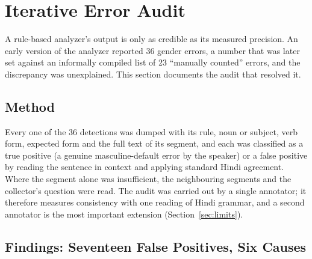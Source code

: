 \documentclass[11pt,a4paper]{report}
\begin{document}
\chapter{Iterative Error Audit}
\label{sec:audit}

A rule-based analyzer's output is only as credible as its measured precision. An early version of the analyzer reported 36 gender errors, a number that was later set against an informally compiled list of 23 ``manually counted'' errors, and the discrepancy was unexplained. This section documents the audit that resolved it.

\section{Method}

Every one of the 36 detections was dumped with its rule, noun or subject, verb form, expected form and the full text of its segment, and each was classified as a true positive (a genuine masculine-default error by the speaker) or a false positive by reading the sentence in context and applying standard Hindi agreement. Where the segment alone was insufficient, the neighbouring segments and the collector's question were read. The audit was carried out by a single annotator; it therefore measures consistency with one reading of Hindi grammar, and a second annotator is the most important extension (Section~\ref{sec:limits}).

\section{Findings: Seventeen False Positives, Six Causes}
\end{document}
